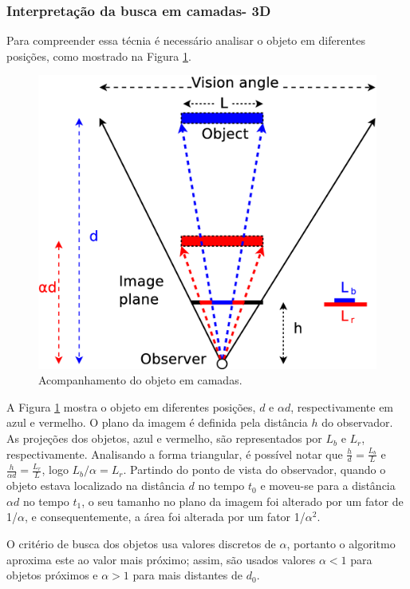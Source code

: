 

\subsubsection{Interpretação da busca em camadas- 3D}

Para compreender essa técnia é necessário analisar o objeto 
em diferentes posições, como mostrado na Figura \ref{fig:multiscale3d}.

\begin{figure}[H]
\centering
  \includegraphics[width=.7\columnwidth]{images/Diagrama3.eps}
  \caption{ Acompanhamento do objeto em camadas.}
  \label{fig:multiscale3d}
\end{figure}

A Figura \ref{fig:multiscale3d} mostra o objeto em diferentes posições, 
$d$ e $\alpha d$, respectivamente em azul e vermelho.
O plano da imagem é definida pela distância $h$ do observador. As projeções dos objetos,
azul e vermelho, são representados por $L_b$ e $L_r$, respectivamente. Analisando a forma
triangular, é possível notar que $\frac{h}{d}=\frac{L_b}{L}$ e $\frac{h}{\alpha d}=\frac{L_r}{L}$, logo 
$L_b/\alpha= L_r$. 
Partindo do ponto de vista do observador, quando o objeto estava localizado na distância $d$ no tempo
$t_0$ e moveu-se para a distância $\alpha d$ no tempo $t_1$, o seu tamanho no plano da imagem 
foi alterado por um fator de 1/$\alpha$, e consequentemente, a área foi alterada por um fator 1/$\alpha^2$.

O critério de busca dos objetos usa valores discretos de $\alpha$, portanto o algoritmo aproxima este
ao valor mais próximo; assim, são usados valores $\alpha<1$
para objetos próximos e  $\alpha>1$ para mais distantes de $d_0$.



